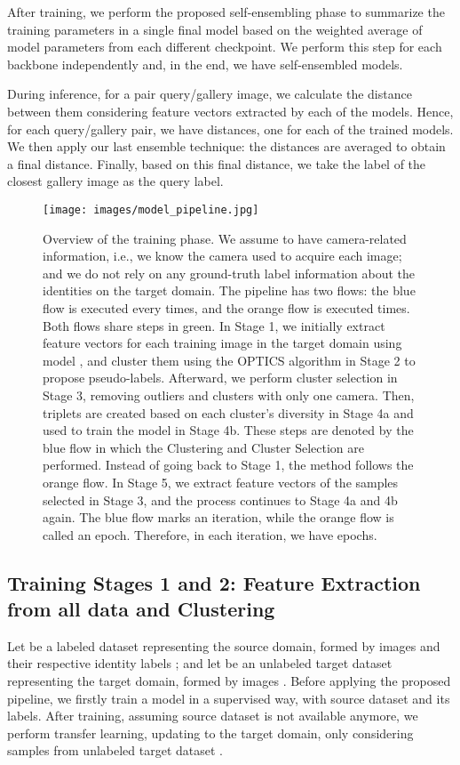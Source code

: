 \documentclass[journal]{IEEEtran}
\begin{document}
After training, we perform the proposed self-ensembling phase to summarize the training parameters in a single final model based on the weighted average of model parameters from each different checkpoint. We perform this step for each backbone independently and, in the end, we have  self-ensembled models. 

During inference, for a pair query/gallery image, we calculate the distance between them considering feature vectors extracted by each of the  models. Hence, for each query/gallery pair, we have  distances, one for each of the trained models. We then apply our last ensemble technique: the  distances are averaged to obtain a final distance. Finally, based on this final distance, we take the label of the closest gallery image as the query label.



\begin{figure*}[ht]
\centering
\texttt{[image: images/model\_pipeline.jpg]}
\caption{Overview of the training phase. We assume to have camera-related information, i.e., we know the camera used to acquire each image; and we do not rely on any ground-truth label information about the identities on the target domain. The pipeline has two flows: the blue flow is executed every  times, and the orange flow is executed  times. Both flows share steps in green. In Stage 1, we initially extract feature vectors for each training image in the target domain using model , and cluster them using the OPTICS algorithm in Stage 2 to propose pseudo-labels. Afterward, we perform cluster selection in Stage 3, removing outliers and clusters with only one camera. Then, triplets are created based on each cluster's diversity in Stage 4a and used to train the model in Stage 4b. These steps are denoted by the blue flow in which the Clustering and Cluster Selection are performed. Instead of going back to Stage 1, the method follows the orange flow. In Stage 5, we extract feature vectors of the samples selected in Stage 3, and the process continues to Stage 4a and 4b again. The blue flow marks an iteration, while the orange flow is called an epoch. Therefore, in each iteration, we have  epochs.}


\label{fig:overview_pipeline}
\end{figure*}

\subsection{Training Stages 1 and 2: Feature Extraction from all data and Clustering}
Let  be a labeled dataset representing the source domain, formed by  images  and their respective identity labels ; and  
let  be an unlabeled target dataset representing the target domain, formed by  images .  Before applying the proposed pipeline, we firstly train a model  in a supervised way, with source dataset  and its labels. After training, assuming source dataset  is not available anymore, we perform transfer learning, updating  to the target domain, only considering samples from unlabeled target dataset .  
\end{document}

